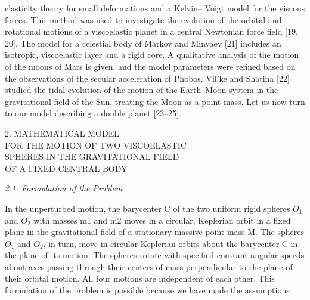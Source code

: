 \documentclass[fontsize = 11pt,a4paper]{article}
\begin{document}
\begin{multicols}{2}
elasticity theory for small deformations and a Kelvin–
Voigt model for the viscous forces. This method
was used to investigate the evolution of the orbital
and rotational motions of a viscoelastic planet in a
central Newtonian force field [19, 20]. The model for a
celestial body of Markov and Minyaev [21] includes
an isotropic, viscoelastic layer and a rigid core. A
qualitative analysis of the motion of the moons of
Mars is given, and the model parameters were refined
based on the observations of the secular acceleration
of Phobos. Vil’ke and Shatina [22] studied the tidal
evolution of the motion of the Earth–Moon system in
the gravitational field of the Sun, treating the Moon
as a point mass.
Let us now turn to our model describing a double
planet [23–25].
\begin{center}
 2. MATHEMATICAL MODEL\\
FOR THE MOTION OF TWO VISCOELASTIC\\
SPHERES IN THE GRAVITATIONAL FIELD\\
OF A FIXED CENTRAL BODY
\end{center}
 \centerline{\emph{2.1. Formulation of the Problem}}
In the unperturbed motion, the barycenter C of the
two uniform rigid spheres $O_{1}$  and $O_{2}$ with masses m1
and m2 moves in a circular, Keplerian orbit in a fixed
plane in the gravitational field of a stationary massive
point mass M. The spheres $O_{1}$ and $O_{2}$, in turn,
move in circular Keplerian orbits about the barycenter
C in the plane of its motion. The spheres rotate
with specified constant angular speeds about axes
passing through their centers of mass perpendicular
to the plane of their orbital motion. All four motions
are independent of each other. This formulation of
the problem is possible because we have made the
assumptions


\end{multicols}
\end{document}
